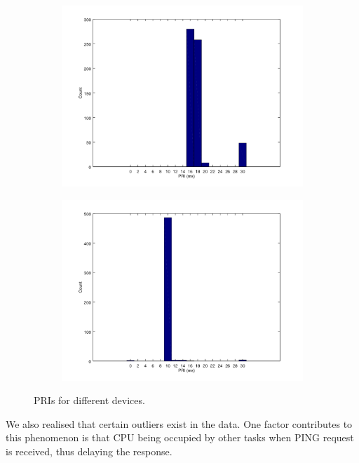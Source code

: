 \begin{figure}[ht!]
	\begin{subfigure}{0.45\linewidth}
		\includegraphics[width=\linewidth]{fig/helloworld_sky.png}
	\end{subfigure}
	\begin{subfigure}{0.45\linewidth}
		\includegraphics[width=\linewidth]{fig/helloworld_CC2538.png}
	\end{subfigure}
	\caption{PRIs for different devices. \label{PRIs}}
\end{figure}

We also realised that certain outliers exist in the data. One factor contributes to this phenomenon is that CPU being occupied by other tasks when PING request is received, thus delaying the response.  

